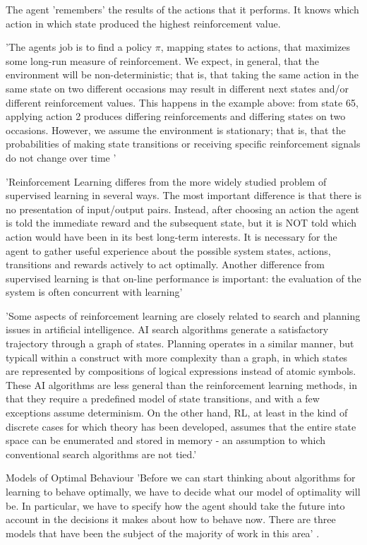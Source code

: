 The agent 'remembers' the results of the actions that it performs. It knows which action in which state produced the highest reinforcement value.

'The agents job is to find a policy $\pi$, mapping states to actions, that maximizes some long-run measure of reinforcement. We expect, in general, that the environment will be non-deterministic; that is, that taking the same action in the same state on two different occasions may result in different next states and/or different reinforcement values. This happens in the example above: from state 65, applying action 2 produces differing reinforcements and differing states on two occasions. However, we assume the environment is stationary; that is, that the probabilities of making state transitions or receiving specific reinforcement signals do not change over time ' \cite{KaelblingLittmanMoore1996}

'Reinforcement Learning differes from the more widely studied problem of supervised learning in several ways. The most important difference is that there is no presentation of input/output pairs. Instead, after choosing an action the agent is told the immediate reward and the subsequent state, but it is NOT told which action would have been in its best long-term interests. It is necessary for the agent to gather useful experience about the possible system states, actions, transitions and rewards actively to act optimally. Another difference from supervised learning is that on-line performance is important: the evaluation of the system is often concurrent with learning' \cite{KaelblingLittmanMoore1996}

'Some aspects of reinforcement learning are closely related to search and planning issues in artificial intelligence. AI search algorithms generate a satisfactory trajectory through a graph of states. Planning operates in a similar manner, but typicall within a construct with more complexity than a graph, in which states are represented by compositions of logical expressions instead of atomic symbols. These AI algorithms are less general than the reinforcement learning methods, in that they require a predefined model of state transitions, and with a few exceptions assume determinism. On the other hand, RL, at least in the kind of discrete cases for which theory has been developed, assumes that the entire state space can be enumerated and stored in memory - an assumption to which conventional search algorithms are not tied.' \cite{KaelblingLittmanMoore1996}

Models of Optimal Behaviour
'Before we can start thinking about algorithms for learning to behave optimally, we have to decide what our model of optimality will be. In particular, we have to specify how the agent should take the future into account in the decisions it makes about how to behave now. There are three models that have been the subject of the majority of work in this area' \cite{KaelblingLittmanMoore1996}.

